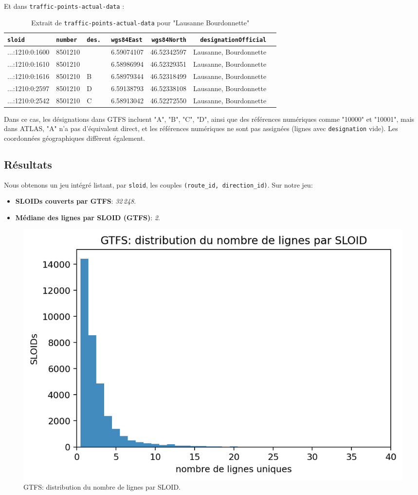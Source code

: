 Et dans \texttt{traffic-points-actual-data} :

\begin{table}[H]
\caption{Extrait de \texttt{traffic-points-actual-data} pour "Lausanne Bourdonnette"}
\label{tab:traffic_bourdonnette_2}
\centering
\begin{tabular}{l l l l r r l}
\toprule
\texttt{sloid} & \texttt{number} & \texttt{des.
}  & \texttt{wgs84East} & \texttt{wgs84North} & \texttt{designationOfficial} \\
\midrule
...:1210:0:1600 & 8501210 &  & 6.59074107 & 46.52342597 & Lausanne, Bourdonnette \\
...:1210:0:1610 & 8501210 &  & 6.58986994 & 46.52329351 & Lausanne, Bourdonnette \\
...:1210:0:1616 & 8501210 & B & 6.58979344 & 46.52318499 & Lausanne, Bourdonnette \\
...:1210:0:2597 & 8501210 & D & 6.59138793 & 46.52338108 & Lausanne, Bourdonnette \\
...:1210:0:2542 & 8501210 & C & 6.58913042 & 46.52272550 & Lausanne, Bourdonnette \\
\bottomrule
\end{tabular}
\end{table}

Dans ce cas, les désignations dans GTFS incluent "A", "B", "C", "D", ainsi que des références numériques comme "10000" et "10001", mais dans ATLAS,  "A" n’a pas d’équivalent direct, et les références numériques ne sont pas assignées (lignes avec \texttt{designation} vide). Les coordonnées géographiques diffèrent également.

\subsection{Résultats}
Nous obtenons un jeu intégré listant, par \texttt{sloid}, les couples \texttt{(route\_id, direction\_id)}. Sur notre jeu:
\begin{itemize}
  \item \textbf{SLOIDs couverts par GTFS}: \textit{32\,248}.
  \item \textbf{Médiane des lignes par SLOID (GTFS)}: \textit{2}.
\end{itemize}

\begin{figure}[h]
  \centering
  \includegraphics[width=.7\linewidth]{figures/plots/gtfs_routes_per_sloid.png}
  \caption[GTFS: lignes par SLOID]{GTFS: distribution du nombre de lignes par SLOID.}
  \label{fig:gtfs_lines_per_sloid}
\end{figure}

